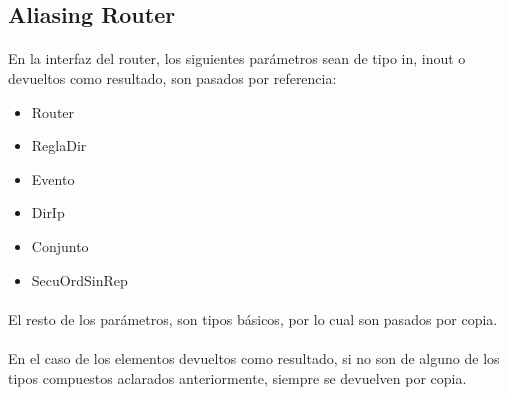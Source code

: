\subsection*{Aliasing Router}

\paragraph{}
En la interfaz del router, los siguientes par\'ametros sean de tipo in, inout o devueltos como resultado, son pasados por referencia:
\begin{itemize}
 \item Router
 \item ReglaDir
 \item Evento
 \item DirIp 
 \item Conjunto
 \item SecuOrdSinRep
\end{itemize}

\paragraph{}
El resto de los par\'ametros, son tipos b\'asicos, por lo cual son pasados por copia.

\paragraph{}
En el caso de los elementos devueltos como resultado, si no son de alguno de los tipos compuestos aclarados anteriormente, siempre se devuelven por copia.
